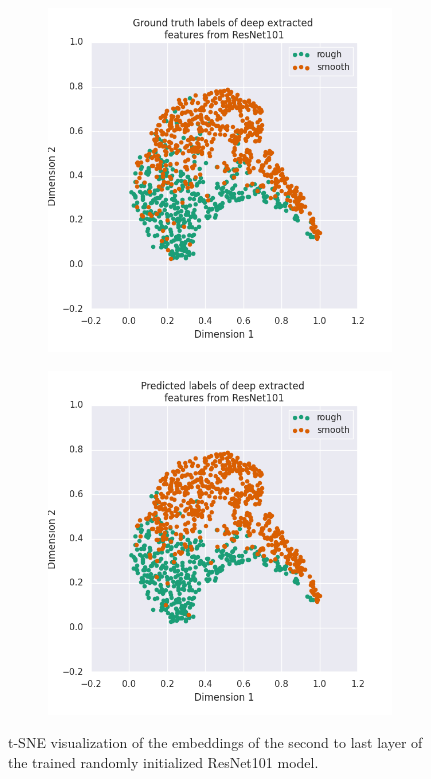 \documentclass[12pt]{article}
\begin{document}
\begin{figure}[h]
    \centering
    \begin{subfigure}{.45\textwidth}
        \includegraphics[width=1\linewidth]{assets/plots/resnet101_gt_tsne.png}
    \end{subfigure}
    \begin{subfigure}{.45\textwidth}
        \includegraphics[width=1\linewidth]{assets/plots/resnet101_pred_tsne.png}
    \end{subfigure}
    \caption{t-SNE visualization of the embeddings of the second to last layer of the
        trained randomly initialized ResNet101 model.}
    \label{fig:resnet101_tsne}
\end{figure}
\end{document}
